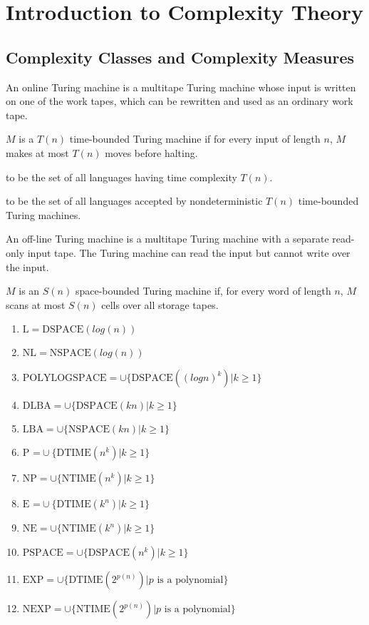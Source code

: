 \section{Introduction to Complexity Theory}

\subsection{Complexity Classes and Complexity Measures}

 An online Turing machine is a multitape Turing machine whose input is written on one
of the work tapes, which can be rewritten and used as an ordinary work tape.

 $M$ is a $T(n)$ time-bounded Turing machine if for every 
input of length $n$, $M$ makes at most $T(n)$ moves before halting. 

 to be the set of all languages having time complexity
$T(n)$.

 to be the set of all languages accepted by nondeterministic
$T(n)$ time-bounded Turing machines.

 An off-line Turing machine is a multitape Turing machine with a separate
read-only input tape. The Turing machine can read the input but cannot write over the
input.

 $M$ is an $S(n)$ space-bounded Turing machine if, for
every word of length $n$, $M$ scans at most $S(n)$ cells over all storage tapes.

\begin{enumerate}
  \item $\text{L} = \text{DSPACE}(log(n))$
  \item $\text{NL} = \text{NSPACE}(log(n))$
  \item $\text{POLYLOGSPACE} = \cup \{\text{DSPACE}((logn)^k) | k \ge 1\}$
  \item $\text{DLBA} = \cup \{\text{DSPACE}(kn) | k \ge 1\}$
  \item $\text{LBA} = \cup \{\text{NSPACE}(kn) | k \ge1\}$
  \item $\text{P =} \cup \{\text{DTIME}(n^k) | k \ge 1\}$
  \item $\text{NP} = \cup \{\text{NTIME}(n^k) | k \ge1\}$
  \item $\text{E =} \cup \{\text{DTIME}(k^n) | k \ge 1\}$
  \item $\text{NE} = \cup \{\text{NTIME}(k^n) | k \ge 1\}$
  \item $\text{PSPACE} = \cup \{\text{DSPACE}(n^k) | k \ge 1\}$
  \item $\text{EXP} = \cup \{\text{DTIME}(2^{p(n)}) | p \text{ is a polynomial}\}$
  \item $\text{NEXP} = \cup \{\text{NTIME}(2^{p(n)}) | p \text{ is a polynomial}\}$
\end{enumerate}
